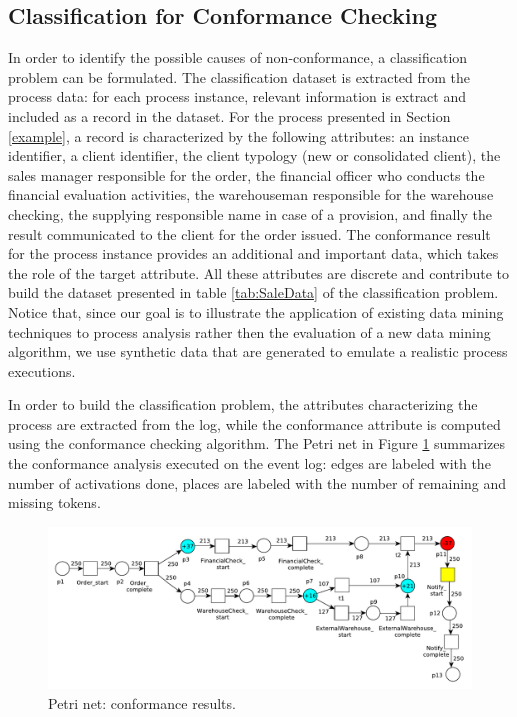 \documentclass{llncs}
\begin{document}
\subsection{Classification for Conformance Checking}\label{ClassConformance}
In order to identify the possible causes of non-conformance, a
classification problem can be formulated. The classification dataset
is extracted from the process data: for each process instance,
relevant information is  extract and included as a record in the
dataset.
For the process presented in Section \ref{example}, a record is
characterized by the following attributes: an instance identifier, a
client identifier, the client typology (new or consolidated client),
the sales manager responsible for the order, the financial officer who
conducts the financial evaluation activities, the warehouseman
responsible for the warehouse checking, the supplying responsible name
in case of a provision, and finally the result communicated to the
client for the order issued. The conformance result for the process
instance provides an additional and important data, which takes the
role of the target attribute. 
All these attributes are discrete and contribute to build the dataset
presented in table \ref{tab:SaleData} of the classification
problem. Notice that, since our goal is to illustrate the application
of existing data mining techniques to process analysis rather then the
evaluation of a new data mining algorithm, we use synthetic data that
are generated to emulate a realistic process executions.

In order to build the classification problem, the attributes characterizing the
process are extracted from the log, while the conformance attribute is
computed using the conformance checking algorithm.
The Petri net in Figure \ref{replayResult}  summarizes the
conformance analysis executed on the event log:
edges are labeled with the number of activations done,
places are labeled with the number of remaining and missing tokens.
\begin{figure}[h]
\includegraphics[width=360pt]
{./items/Sales_PN_resultMod.pdf}
\caption{Petri net: conformance results.}
\label{replayResult}
\end{figure}
\end{document}
